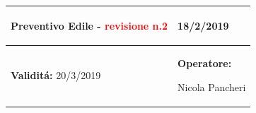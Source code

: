 \documentclass[a4paper]{article}
\begin{document}
                                  \begin{center}
                                  \begin{tabular}{|L{89mm} R{60mm}| }
                                  \hline
                                  \vspace{2.5mm}
                                  \begin{spacing}{0}
                                \textbf{Preventivo Edile - } \textcolor{red}{revisione n.2}
                                  \end{spacing}&
                                  \vspace{2.5mm}
                                  \begin{spacing}{0}

                                18/2/2019

                                  \end{spacing}\\
                                  \hline
                                  \vspace{2.5mm}
                                  \begin{spacing}{0}

                                
                                        \textbf{Validit\'a:}
                                   20/3/2019
                                  \end{spacing} &
                                  \vspace{2.5mm}
                                  \begin{spacing}{0}
                                    \textbf{Operatore:}

                               Nicola Pancheri
                                  \end{spacing} \\
                                  \hline
                                  \end{tabular}
                                  \end{center}
                               
\end{document}
